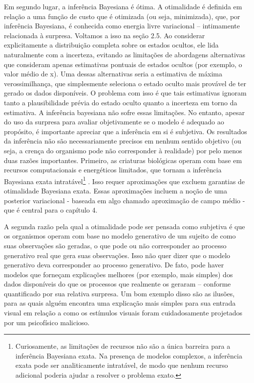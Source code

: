 \documentclass[
  12pt,
]{book}
\begin{document}
Em segundo lugar, a inferência Bayesiana é ótima. A otimalidade é definida em relação a uma função de custo que é otimizada (ou seja, minimizada), que, por inferência Bayesiana, é conhecida como energia livre variacional -- intimamente relacionada à surpresa. Voltamos a isso na seção 2.5. Ao considerar explicitamente a distribuição completa sobre os estados ocultos, ele lida naturalmente com a incerteza, evitando as limitações de abordagens alternativas que consideram apenas estimativas pontuais de estados ocultos (por exemplo, o valor médio de x). Uma dessas alternativas seria a estimativa de máxima verossimilhança, que simplesmente seleciona o estado oculto mais provável de ter gerado os dados disponíveis. O problema com isso é que tais estimativas ignoram tanto a plausibilidade prévia do estado oculto quanto a incerteza em torno da estimativa. A inferência bayesiana não sofre essas limitações. No entanto, apesar do uso da surpresa para avaliar objetivamente se o modelo é adequado ao propósito, é importante apreciar que a inferência em si é subjetiva. Os resultados da inferência não são necessariamente precisos em nenhum sentido objetivo (ou seja, a crença do organismo pode não corresponder à realidade) por pelo menos duas razões importantes. Primeiro, as criaturas biológicas operam com base em recursos computacionais e energéticos limitados, que tornam a inferência Bayesiana exata intratável\footnote{Curiosamente, as limitações de recursos não são a única barreira para a inferência Bayesiana exata. Na presença de modelos complexos, a inferência exata pode ser analiticamente intratável, de modo que nenhum recurso adicional poderia ajudar a resolver o problema exato.} . Isso requer aproximações que excluem garantias de otimalidade Bayesiana exata. Essas aproximações incluem a noção de uma posterior variacional - baseada em algo chamado aproximação de campo médio - que é central para o capítulo 4.

A segunda razão pela qual a otimalidade pode ser pensada como subjetiva é que os organismos operam com base no modelo generativo de um sujeito de como suas observações são geradas, o que pode ou não corresponder ao processo generativo real que gera suas observações. Isso não quer dizer que o modelo generativo deva corresponder ao processo generativo. De fato, pode haver modelos que forneçam explicações melhores (por exemplo, mais simples) dos dados disponíveis do que os processos que realmente os geraram -- conforme quantificado por sua relativa surpresa. Um bom exemplo disso são as ilusões, para as quais alguém encontra uma explicação mais simples para sua entrada visual em relação a como os estímulos visuais foram cuidadosamente projetados por um psicofísico malicioso.
\end{document}
